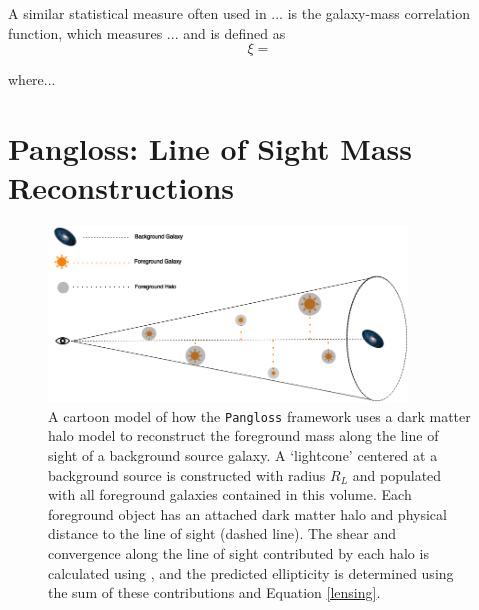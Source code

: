 \documentclass[%
 reprint,
 amsmath,amssymb,
 aps,nofootinbib
]{revtex4-1}
\begin{document}
A similar statistical measure often used in ... is the galaxy-mass correlation function, which measures ... and is defined as
\begin{equation}\label{ng_corr_def}
\xi=
\end{equation}

\noindent where...


\section{Pangloss: Line of Sight Mass Reconstructions} \label{pangloss}

\begin{figure}
    \centering
    \includegraphics[width=0.85\textwidth]{figs-swe/thesis/pangloss_cartoon.png}
    \captionsetup{justification=raggedright,singlelinecheck=false}
    \caption{A cartoon model of how the \texttt{Pangloss} framework uses a dark matter halo model to reconstruct the foreground mass along the line of sight of a background source galaxy. A `lightcone' centered at a background source is constructed with radius $R_L$ and populated with all foreground galaxies contained in this volume. Each foreground object has an attached dark matter halo and physical distance to the line of sight (dashed line). The shear and convergence along the line of sight contributed by each halo is calculated using \cite{lensing_calc}, and the predicted ellipticity is determined using the sum of these contributions and Equation \eqref{lensing}.}
    \label{pangloss_cartoon}
\end{figure}
\end{document}
